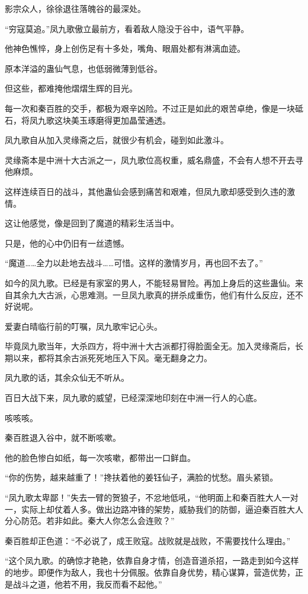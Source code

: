 \begin{this_body}
影宗众人，徐徐退往落魄谷的最深处。

“穷寇莫追。”凤九歌傲立最前方，看着敌人隐没于谷中，语气平静。

他神色憔悴，身上创伤足有十多处，嘴角、眼眉处都有淋漓血迹。

原本洋溢的蛊仙气息，也低弱微薄到低谷。

但这些，都难掩他熠熠生辉的目光。

每一次和秦百胜的交手，都极为艰辛凶险。不过正是如此的艰苦卓绝，像是一块砥石，将凤九歌这块美玉琢磨得更加晶莹通透。

凤九歌自从加入灵缘斋之后，就很少有机会，碰到如此激斗。

灵缘斋本是中洲十大古派之一，凤九歌位高权重，威名鼎盛，不会有人想不开去寻他麻烦。

这样连续百日的战斗，其他蛊仙会感到痛苦和艰难，但凤九歌却感受到久违的激情。

这让他感觉，像是回到了魔道的精彩生活当中。

只是，他的心中仍旧有一丝遗憾。

“魔道……全力以赴地去战斗……可惜。这样的激情岁月，再也回不去了。”

如今的凤九歌。已经是有家室的男人，不能轻易冒险。再加上身后的这些蛊仙。来自其余九大古派，心思难测。一旦凤九歌真的拼杀成重伤，他们有什么反应，还不好说呢。

爱妻白晴临行前的叮嘱，凤九歌牢记心头。

毕竟凤九歌当年，大杀四方，将中洲十大古派都打得脸面全无。加入灵缘斋后，长期以来，都将其余古派死死地压入下风。毫无翻身之力。

凤九歌的话，其余众仙无不听从。

百日大战下来，凤九歌的威望，已经深深地印刻在中洲一行人的心底。

咳咳咳。

秦百胜退入谷中，就不断咳嗽。

他的脸色惨白如纸，每一次咳嗽，都带出一口鲜血。

“你的伤势，越来越重了！”搀扶着他的姜钰仙子，满脸的忧愁。眉头紧锁。

“凤九歌太卑鄙！”失去一臂的贺狼子，不忿地低吼，“他明面上和秦百胜大人一对一，实际上却仗着人多。做出边路冲锋的架势，威胁我们的防御，逼迫秦百胜大人分心防范。若非如此。秦大人你怎么会连败？”

秦百胜却正色道：“不必说了，成王败寇。战败就是战败，不需要找什么理由。”

“这个凤九歌。的确惊才艳艳，依靠自身才情，创造音道杀招，一路走到如今这样的地步。即便作为敌人，我也十分佩服。依靠自身优势，精心谋算，营造优势，正是战斗之道，他若不用，我反而看不起他。”


\end{this_body}
